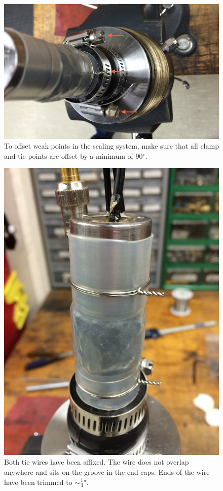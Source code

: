 \begin{figure}
	\centering
        \includegraphics[scale=0.7]{appendix_sample_prep/seal_orientation.jpg}
   	\caption{To offset weak points in the sealing system, make sure that all clamp and tie points are offset by a minimum of 90$^\circ$.}
  	\label{seal_orientation}
\end{figure}

\begin{figure}
	\centering
        \includegraphics[scale=0.7]{appendix_sample_prep/all_tied.jpg}
   	\caption{Both tie wires have been affixed.  The wire does not overlap anywhere and sits on the groove in the end caps. Ends of the wire have been trimmed to  $\sim \frac{1}{4}$".}
  	\label{all_tied}
\end{figure}

